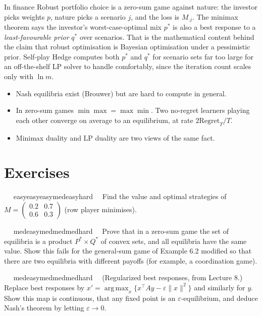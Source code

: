 \documentclass[11pt,a4paper,openany]{book}
\newcommand{\eps}{\varepsilon}
\newcommand{\Reg}{\mathrm{Regret}}
\DeclareMathOperator*{\argmax}{arg\,max}
\newcommand{\norm}[1]{\lVert #1\rVert}
\newcommand{\extag}[2]{%
  \def\tmp{#1}\def\tmpE{easy}\def\tmpM{med}\def\tmpH{hard}%
  \ifx\tmp\tmpE\def\tagc{defc}\else\ifx\tmp\tmpM\def\tagc{thmc}\else\ifx\tmp\tmpH\def\tagc{warnc}\else\def\tagc{finc}\fi\fi\fi
  \tcbox[on line,boxrule=0pt,arc=2pt,colback=\tagc!12,left=2pt,right=2pt,top=0pt,bottom=0pt,boxsep=1pt]{\sffamily\scriptsize\bfseries\color{\tagc}#2}}
\newcommand{\exercise}[3]{\par\medskip\noindent\textbf{\sffamily #1}\ \ #2\ \ #3\par}
\begin{document}
\begin{bfin}{In finance}
Robust portfolio choice is a zero-sum game against nature: the investor picks weights $p$, nature picks a scenario $j$, and the loss is $M_{\cdot j}$. The minimax theorem says the investor's worst-case-optimal mix $p^*$ is also a best response to a \emph{least-favourable prior} $q^*$ over scenarios. That is the mathematical content behind the claim that robust optimisation is Bayesian optimisation under a pessimistic prior. Self-play Hedge computes both $p^*$ and $q^*$ for scenario sets far too large for an off-the-shelf LP solver to handle comfortably, since the iteration count scales only with $\ln m$.
\end{bfin}

\begin{takeaways}
\begin{itemize}
\item Nash equilibria exist (Brouwer) but are hard to compute in general.
\item In zero-sum games $\min\max=\max\min$. Two no-regret learners playing each other converge on average to an equilibrium, at rate $2\Reg_T/T$.
\item Minimax duality and LP duality are two views of the same fact.
\end{itemize}
\end{takeaways}

\section*{Exercises}\label{ch6-ex}

\exercise{6.1}{\extag{easy}{warm-up}}{\hypertarget{sol-6.1}{}Find the value and optimal strategies of $M=\begin{pmatrix}0.2&0.7\\0.6&0.3\end{pmatrix}$ (row player minimises).}

\exercise{6.2}{\extag{med}{core}}{\hypertarget{sol-6.2}{}Prove that in a zero-sum game the set of equilibria is a product $P^*\times Q^*$ of convex sets, and all equilibria have the same value. Show this fails for the general-sum game of Example 6.2 modified so that there are two equilibria with different payoffs (for example, a coordination game).}

\exercise{6.3}{\extag{med}{core}}{\hypertarget{sol-6.3}{}(Regularized best responses, from Lecture 8.) Replace best responses by $x'=\argmax_x\{x^\top Ay-\eps\norm{x}^2\}$ and similarly for $y$. Show this map is continuous, that any fixed point is an $\eps$-equilibrium, and deduce Nash's theorem by letting $\eps\to0$.}
\end{document}
